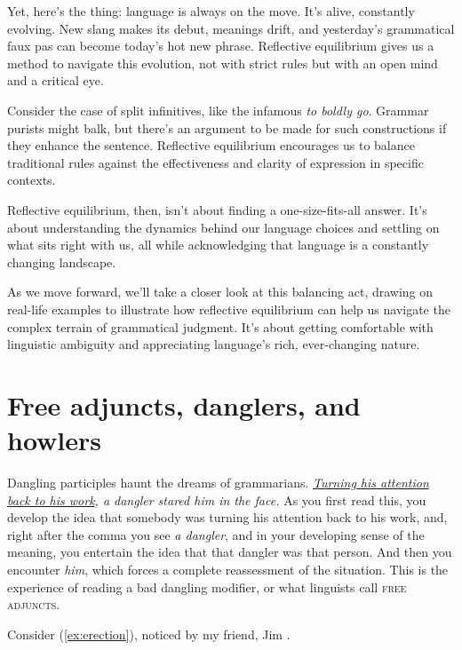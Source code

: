 Yet, here's the thing: language is always on the move. It's alive, constantly evolving. New slang makes its debut, meanings drift, and yesterday's grammatical faux pas can become today's hot new phrase. Reflective equilibrium gives us a method to navigate this evolution, not with strict rules but with an open mind and a critical eye.

Consider the case of split infinitives, like the infamous \textit{to boldly go}. Grammar purists might balk, but there's an argument to be made for such constructions if they enhance the sentence. Reflective equilibrium encourages us to balance traditional rules against the effectiveness and clarity of expression in specific contexts.

Reflective equilibrium, then, isn't about finding a one-size-fits-all answer. It's about understanding the dynamics behind our language choices and settling on what sits right with us, all while acknowledging that language is a constantly changing landscape.

As we move forward, we'll take a closer look at this balancing act, drawing on real-life examples to illustrate how reflective equilibrium can help us navigate the complex terrain of grammatical judgment. It's about getting comfortable with linguistic ambiguity and appreciating language's rich, ever-changing nature.

\section{Free adjuncts, danglers, and howlers}

Dangling participles haunt the dreams of grammarians. \textit{\uline{Turning his attention back to his work}, a dangler stared him in the face.} As you first read this, you develop the idea that somebody was turning his attention back to his work, and, right after the comma you see \textit{a dangler}, and in your developing sense of the meaning, you entertain the idea that that dangler was that person. And then you encounter \textit{him}, which forces a complete reassessment of the situation. This is the experience of reading a bad dangling modifier, or what linguists call \textsc{free adjuncts}.

Consider (\ref{ex:erection}), noticed by my friend, Jim \citet{Donaldson2020}.

\label{ex:erection}
\z

